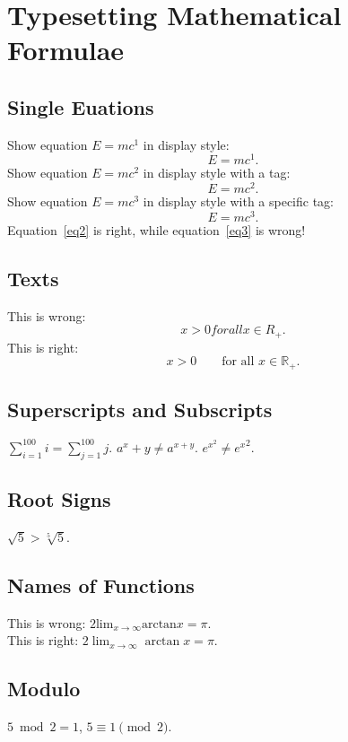 \documentclass[a4paper,10pt]{article}
\begin{document}
    \section{Typesetting Mathematical Formulae}
    \subsection{Single Euations}
    Show equation $E=mc^1$ in display style:
    \begin{equation*}
        E=mc^1.
    \end{equation*}
    Show equation $E=mc^2$ in display style with a tag:
    \begin{equation}
        E=mc^2. \label{eq2}
    \end{equation}
    Show equation $E=mc^3$ in display style with a specific tag:
    \begin{equation}
        E=mc^3. \tag{$\ast$} \label{eq3}
    \end{equation}
    Equation~\eqref{eq2} is right, while equation~\eqref{eq3} is wrong!
    \subsection{Texts}
    This is wrong:
    \begin{equation*}
        x > 0    for all x \in R_+.
    \end{equation*}
    This is right:
    \begin{equation*}
        x > 0 \qquad \text{for all } x \in \mathbb{R_+}.
    \end{equation*}
    \subsection{Superscripts and Subscripts}
    $ \sum_{i=1}^{100} i = \sum^{100}_{j=1} j $.
    $ a^x+y \neq a^{x+y} $.
    $ e^{x^2} \neq {e^x}^2 $.
    \subsection{Root Signs}
    $ \sqrt{5} > \sqrt[5]{5} $.
    \subsection{Names of Functions}
    This is wrong:
    $ 2 \text{lim}_{x \rightarrow \infty} \text{arctan} x = \pi $.\\
    This is right:
    $ 2 \lim_{x \rightarrow \infty} \arctan x = \pi $.
    \subsection{Modulo}
    $ 5 \bmod 2 = 1$, $ 5 \equiv 1 \pmod{2}$.
\end{document}
